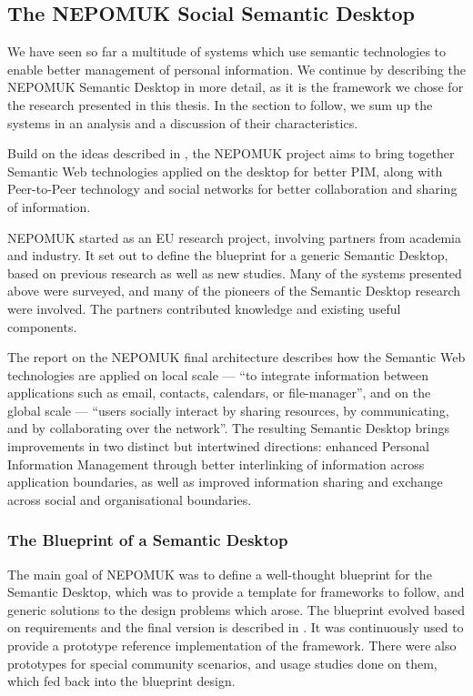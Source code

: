 \subsection{The NEPOMUK Social Semantic Desktop}
\label{sub:nepomuk}

We have seen so far a multitude of systems which use semantic technologies to enable better management of personal information. We continue by describing the NEPOMUK Semantic Desktop in more detail, as it is the framework we chose for the research presented in this thesis. In the section to follow, we sum up the systems in an analysis and a discussion of their characteristics.

Build on the ideas described in \cite{Decker2004}, the NEPOMUK project aims to bring together Semantic Web technologies applied on the desktop for better PIM, along with Peer-to-Peer technology and social networks for better collaboration and sharing of information.

NEPOMUK started as an EU research project, involving partners from academia and industry. It set out to define the blueprint \cite{Bernardi2008} for a generic Semantic Desktop, based on previous research as well as new studies. Many of the systems presented above were surveyed, and many of the pioneers of the Semantic Desktop research were involved. The partners contributed knowledge and existing useful components. 

The report on the NEPOMUK final architecture \cite{Reif2008} describes how the Semantic Web technologies are applied on local scale --- ``to integrate information between applications such as email, contacts, calendars, or file-manager'', and on the global scale --- ``users socially interact by sharing resources, by communicating, and by collaborating over the network''. 
The resulting Semantic Desktop brings improvements in two distinct but intertwined directions: enhanced Personal Information Management through better interlinking of information across application boundaries, as well as improved information sharing and exchange across social and organisational boundaries.

\subsubsection{The Blueprint of a Semantic Desktop}

The main goal of NEPOMUK was to define a well-thought blueprint for the Semantic Desktop, which was to provide a template for frameworks to follow, and generic solutions to the design problems which arose. The blueprint evolved based on requirements and the final version is described in \cite{Reif2008}.
It was continuously used to provide a prototype reference implementation of the framework. There were also prototypes for special community scenarios, and usage studies done on them, which fed back into the blueprint design.

